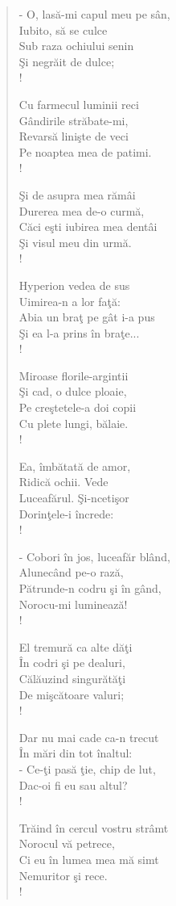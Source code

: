 \documentclass{article}
\begin{document}
\begin{small}
\begin{multicols}{3}
\begin{verse}
- O, lasă-mi capul meu pe sân, \\
Iubito, să se culce \\
Sub raza ochiului senin \\
Şi negrăit de dulce; \\!

Cu farmecul luminii reci \\
Gândirile străbate-mi, \\
Revarsă linişte de veci \\
Pe noaptea mea de patimi. \\!

Şi de asupra mea rămâi \\
Durerea mea de-o curmă, \\
Căci eşti iubirea mea dentâi \\
Şi visul meu din urmă. \\!

Hyperion vedea de sus \\
Uimirea-n a lor faţă: \\
Abia un braţ pe gât i-a pus \\
Şi ea l-a prins în braţe... \\!

Miroase florile-argintii \\
Şi cad, o dulce ploaie, \\
Pe creştetele-a doi copii \\
Cu plete lungi, bălaie. \\!

Ea, îmbătată de amor, \\
Ridică ochii. Vede \\
Luceafărul. Şi-ncetişor \\
Dorinţele-i încrede: \\!

- Cobori în jos, luceafăr blând, \\
Alunecând pe-o rază, \\
Pătrunde-n codru şi în gând, \\
Norocu-mi luminează! \\!

El tremură ca alte dăţi \\
În codri şi pe dealuri, \\
Călăuzind singurătăţi \\
De mişcătoare valuri; \\!

Dar nu mai cade ca-n trecut \\
În mări din tot înaltul: \\
- Ce-ţi pasă ţie, chip de lut, \\
Dac-oi fi eu sau altul? \\!

Trăind în cercul vostru strâmt \\
Norocul vă petrece, \\
Ci eu în lumea mea mă simt \\
Nemuritor şi rece. \\!
\end{verse}
\end{multicols}
\end{small}
\fi
\end{document}
